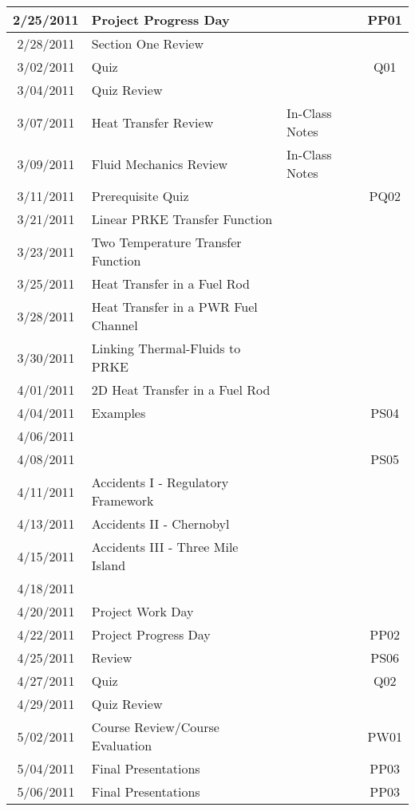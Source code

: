 {\begin{center}
\begin{longtable}{cllc}
2/25/2011 &	Project Progress Day 					& 				& PP01  \\ \hline
2/28/2011 &	Section One Review 						& 				& 		\\
3/02/2011 &	Quiz 									& 				& Q01	\\ 
3/04/2011 &	Quiz Review 							& 				& 		\\ \hline
3/07/2011 & Heat Transfer Review 					& In-Class Notes& 		\\
3/09/2011 & Fluid Mechanics Review 					& In-Class Notes& 		\\ 
3/11/2011 & Prerequisite Quiz						& 				& PQ02	\\ \hline
3/21/2011 & Linear PRKE	Transfer Function			& 				& 		\\
3/23/2011 & Two Temperature Transfer Function 		& 				& 		\\
3/25/2011 & Heat Transfer in a Fuel Rod		 		& 				& 		\\ \hline
3/28/2011 & Heat Transfer in a PWR Fuel Channel  	& 				& 		\\
3/30/2011 & Linking Thermal-Fluids to PRKE 			& 				& 		\\
4/01/2011 & 2D Heat Transfer in a Fuel Rod			& 				& 		\\ \hline
4/04/2011 & Examples 								& 				& PS04 	\\
4/06/2011 & 										& 				& 		\\
4/08/2011 & 										& 				& PS05	\\ \hline
4/11/2011 & Accidents I - Regulatory Framework		& 				& 		\\
4/13/2011 & Accidents II - Chernobyl 				& 				& 		\\
4/15/2011 & Accidents III - Three Mile Island 		& 				& 		\\ \hline
4/18/2011 & 										&				& 		\\
4/20/2011 & Project Work Day 						& 				& 		\\
4/22/2011 & Project Progress Day 					& 				& PP02	\\ \hline
4/25/2011 & Review 									& 				& PS06	\\
4/27/2011 & Quiz									& 				& Q02	\\
4/29/2011 & Quiz Review 							& 				&  		\\ \hline
5/02/2011 & Course Review/Course Evaluation 		& 				& PW01	\\
5/04/2011 & Final Presentations						& 				& PP03	\\
5/06/2011 & Final Presentations 					& 				& PP03	\\ \hline
\end{longtable}
\end{center}
}

